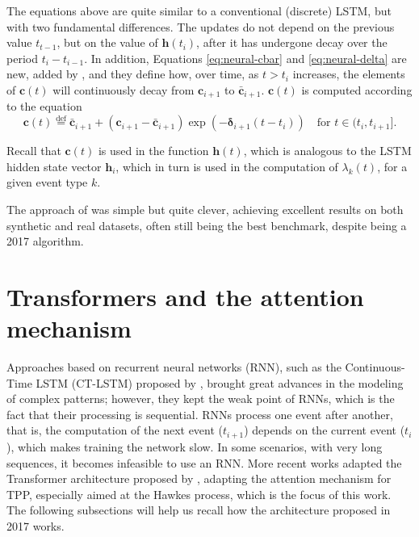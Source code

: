     The equations above are quite similar to a conventional (discrete) LSTM, but with two fundamental differences. The updates do not depend on the previous value $t_{t-1}$, but on the value of $\mathbf{h}(t_i)$, after it has undergone decay over the period $t_i-t_{i-1}$. In addition, Equations \eqref{eq:neural-cbar} and \eqref{eq:neural-delta} are new, added by , and they define how, over time, as $t>t_i$ increases, the elements of $\mathbf{c}(t)$ will continuously decay from $\mathbf{c}_{i+1}$ to $\mathbf{\bar{c}}_{i+1}$. $\mathbf{c}(t)$ is computed according to the equation
    \begin{equation}
        \mathbf{c}(t) \overset{\text{def}}{=} \mathbf{\bar{c}}_{i+1} + (\mathbf{c}_{i+1}-\mathbf{\bar{c}}_{i+1}) \exp(-\mathbf{\delta}_{i+1}(t-t_i)) \quad \text{for } t \in (t_i,t_{i+1}].
        \label{eq:neural-ct}
    \end{equation}

    Recall that $\mathbf{c}(t)$ is used in the function $\mathbf{h}(t)$, which is analogous to the LSTM hidden state vector $\mathbf{h}_i$, which in turn is used in the computation of $\lambda_k(t)$, for a given event type $k$.

    The approach of  was simple but quite clever, achieving excellent results on both synthetic and real datasets, often still being the best benchmark, despite being a 2017 algorithm.

\section{Transformers and the attention mechanism}\label{sec:transformers-atencao}

    Approaches based on recurrent neural networks (RNN), such as the Continuous-Time LSTM (CT-LSTM) proposed by , brought great advances in the modeling of complex patterns; however, they kept the weak point of RNNs, which is the fact that their processing is sequential. RNNs process one event after another, that is, the computation of the next event ($t_{i+1}$) depends on the current event ($t_i$), which makes training the network slow. In some scenarios, with very long sequences, it becomes infeasible to use an RNN. More recent works adapted the Transformer architecture proposed by , adapting the attention mechanism for TPP, especially aimed at the Hawkes process, which is the focus of this work. The following subsections will help us recall how the architecture proposed in 2017 works.

